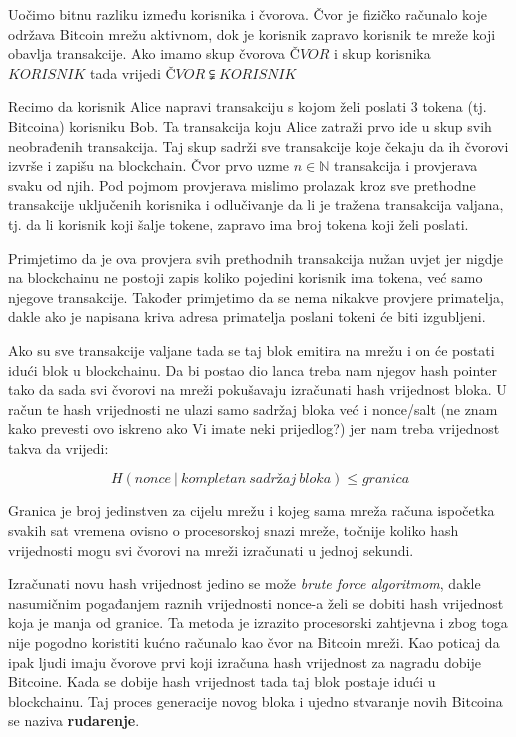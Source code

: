 \documentclass[a4paper,oneside,12pt]{memoir} %
\begin{document}
\begin{napomena}
Uočimo bitnu razliku između korisnika i čvorova. Čvor je fizičko računalo koje održava Bitcoin mrežu aktivnom, dok je korisnik zapravo korisnik te mreže koji obavlja transakcije. Ako imamo skup čvorova $ČVOR$ i skup korisnika $KORISNIK$ tada vrijedi $ČVOR \subsetneqq KORISNIK$
\end{napomena}

Recimo da korisnik Alice napravi transakciju s kojom želi poslati 3 tokena (tj. Bitcoina) korisniku Bob. Ta transakcija koju Alice zatraži prvo ide u skup svih neobrađenih transakcija. Taj skup sadrži sve transakcije koje čekaju da ih čvorovi izvrše i zapišu na blockchain. Čvor prvo uzme $n \in \mathbb{N}$ transakcija i provjerava svaku od njih. Pod pojmom provjerava mislimo prolazak kroz sve prethodne transakcije uključenih korisnika i odlučivanje da li je tražena transakcija valjana, tj. da li korisnik koji šalje tokene, zapravo ima broj tokena koji želi poslati. 

\begin{napomena}
Primjetimo da je ova provjera svih prethodnih transakcija nužan uvjet jer nigdje na blockchainu ne postoji zapis koliko pojedini korisnik ima tokena, već samo njegove transakcije. Također primjetimo da se nema nikakve provjere primatelja, dakle ako je napisana kriva adresa primatelja poslani tokeni će biti izgubljeni.
\end{napomena}

Ako su sve transakcije valjane tada se taj blok emitira na mrežu i on će postati idući blok u blockchainu. Da bi postao dio lanca treba nam njegov hash pointer tako da sada svi čvorovi na mreži pokušavaju izračunati hash vrijednost bloka. U račun te hash vrijednosti ne ulazi samo sadržaj bloka već i nonce/salt (ne znam kako prevesti ovo iskreno ako Vi imate neki prijedlog?) jer nam treba vrijednost takva da vrijedi:

\begin{equation}
\label{eq:hash}
    H(nonce\ |\ kompletan\ sadržaj\ bloka) \leq granica
\end{equation}

\begin{definicija}
Granica je broj jedinstven za cijelu mrežu i kojeg sama mreža računa ispočetka svakih sat vremena ovisno o procesorskoj snazi mreže, točnije koliko hash vrijednosti mogu svi čvorovi na mreži izračunati u jednoj sekundi.
\end{definicija}


Izračunati novu hash vrijednost jedino se može \textit{brute force algoritmom}, dakle nasumičnim pogađanjem raznih vrijednosti nonce-a želi se dobiti hash vrijednost koja je manja od granice. Ta metoda je izrazito procesorski zahtjevna i zbog toga nije  pogodno koristiti kućno računalo kao čvor na Bitcoin mreži. Kao poticaj da ipak ljudi imaju čvorove prvi koji izračuna hash vrijednost za nagradu dobije Bitcoine. Kada se dobije hash vrijednost tada taj blok postaje idući u blockchainu. Taj proces generacije novog bloka i ujedno stvaranje novih Bitcoina se naziva \textbf{rudarenje}.
\end{document}
